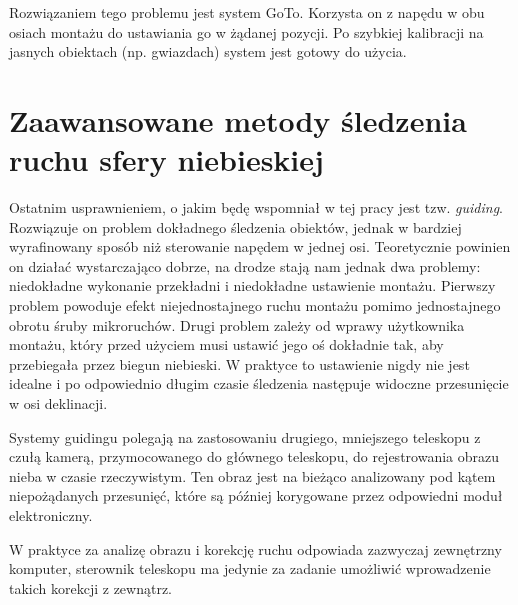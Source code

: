 Rozwiązaniem tego problemu jest system GoTo. Korzysta on z napędu w obu osiach
montażu do ustawiania go w żądanej pozycji. Po szybkiej kalibracji na jasnych
obiektach (np. gwiazdach) system jest gotowy do użycia.

\section{Zaawansowane metody śledzenia ruchu sfery niebieskiej}

Ostatnim usprawnieniem, o jakim będę wspomniał w tej pracy jest tzw.
\emph{guiding}.  Rozwiązuje on problem dokładnego śledzenia obiektów, jednak
w bardziej wyrafinowany sposób niż sterowanie napędem w jednej osi. Teoretycznie
powinien on działać wystarczająco dobrze, na drodze stają nam jednak dwa
problemy: niedokładne wykonanie przekładni i niedokładne ustawienie montażu.
Pierwszy problem powoduje efekt niejednostajnego ruchu montażu pomimo
jednostajnego obrotu śruby mikroruchów. Drugi problem zależy od wprawy
użytkownika montażu, który przed użyciem musi ustawić jego oś dokładnie tak, aby
przebiegała przez biegun niebieski. W praktyce to ustawienie nigdy nie jest
idealne i po odpowiednio długim czasie śledzenia następuje widoczne przesunięcie
w osi deklinacji.

Systemy guidingu polegają na zastosowaniu drugiego, mniejszego teleskopu
z czułą kamerą, przymocowanego do głównego teleskopu, do rejestrowania obrazu
nieba w czasie rzeczywistym. Ten obraz jest na bieżąco analizowany pod kątem
niepożądanych przesunięć, które są później korygowane przez odpowiedni moduł
elektroniczny.

W praktyce za analizę obrazu i korekcję ruchu odpowiada zazwyczaj zewnętrzny
komputer, sterownik teleskopu ma jedynie za zadanie umożliwić wprowadzenie
takich korekcji z zewnątrz.
